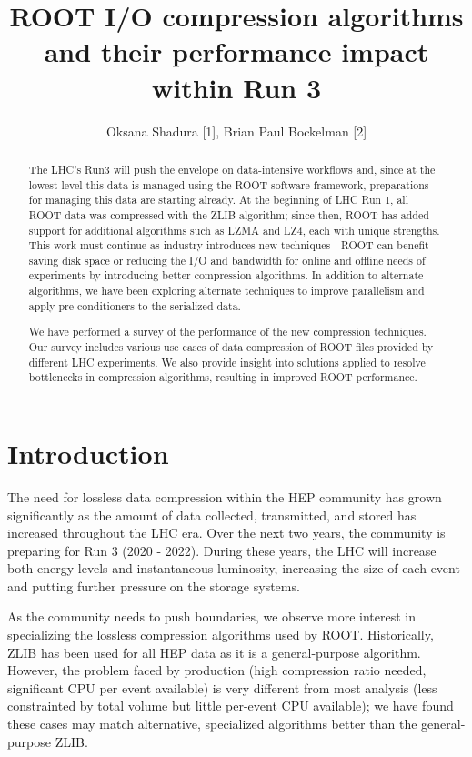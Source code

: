 \documentclass[12pt]{iopart}
\begin{document}
\title{ROOT I/O compression algorithms and their performance impact within Run 3}

\author{Oksana Shadura [1], Brian Paul Bockelman  [2]}
\address{[1] University of Nebraska-Lincoln, USA, [2] Morgridge Institute for Research, USA}
\vspace{10pt}

\begin{abstract}

The LHC’s Run3 will push the envelope on data-intensive workflows and, since at the lowest level this data is managed using the ROOT software framework, preparations for managing this data are starting already. At the beginning of LHC Run 1, all ROOT data was compressed with the ZLIB algorithm; since then, ROOT has added support for additional algorithms such as LZMA and LZ4, each with unique strengths.   This work must continue as industry introduces new techniques - ROOT can benefit saving disk space or reducing the I/O and bandwidth for online and offline needs of experiments by introducing better compression algorithms. In addition to alternate algorithms, we have been exploring alternate techniques to improve parallelism and apply pre-conditioners to the serialized data.

We have performed a survey of the performance of the new compression techniques. Our survey includes various use cases of data compression of ROOT files provided by different LHC experiments. We also provide insight into solutions applied to resolve bottlenecks in compression algorithms, resulting in  improved ROOT performance.
\end{abstract}

\section{Introduction}

The need for lossless data compression within the HEP community has grown significantly as the amount of data collected, transmitted, and stored has increased throughout the LHC era. Over the next two years, the community is preparing for Run 3 (2020 - 2022).  During these years, the LHC will increase both energy levels and instantaneous luminosity, increasing the size of each event and putting further pressure on the storage systems.

As the community needs to push boundaries, we observe more interest in specializing the lossless compression algorithms used by ROOT.  Historically, ZLIB has been used for all HEP data as it is a general-purpose algorithm.  However, the problem faced by production (high compression ratio needed, significant CPU per event available) is very different from most analysis (less constrainted by total volume but little per-event CPU available); we have found these cases may match alternative, specialized algorithms better than the general-purpose ZLIB.
\end{document}
